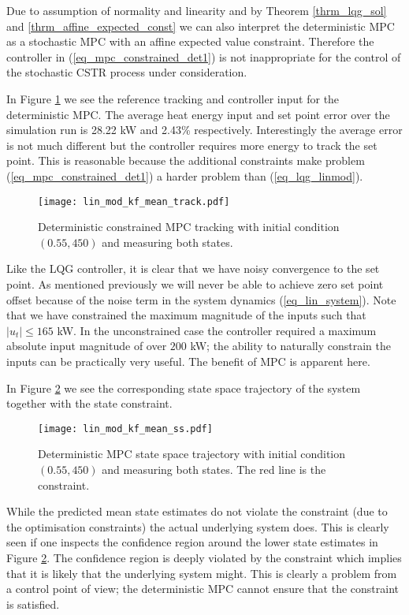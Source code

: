 Due to assumption of normality and linearity and by Theorem \ref{thrm_lqg_sol} and \ref{thrm_affine_expected_const} we can also interpret the deterministic MPC as a stochastic MPC with an affine expected value constraint. Therefore the controller in (\ref{eq_mpc_constrained_det1}) is not inappropriate for the control of the stochastic CSTR process under consideration.

In Figure \ref{fig_lin_mod_kf_mean_track} we see the reference tracking and controller input for the deterministic MPC. The average heat energy input and set point error over the simulation run is 28.22 kW and 2.43\% respectively. Interestingly the average error is not much different but the controller requires more energy to track the set point. This is reasonable because the additional constraints make problem (\ref{eq_mpc_constrained_det1}) a harder problem than (\ref{eq_lqg_linmod}).
\begin{figure}[H] 
\centering
\texttt{[image: lin\_mod\_kf\_mean\_track.pdf]}
\caption{Deterministic constrained MPC tracking with initial condition $(0.55, 450)$ and measuring both states.}
\label{fig_lin_mod_kf_mean_track}
\end{figure}
Like the LQG controller, it is clear that we have noisy convergence to the set point. As mentioned previously we will never be able to achieve zero set point offset because of the noise term in the system dynamics (\ref{eq_lin_system}). Note that we have constrained the maximum magnitude of the inputs such that $|u_t| \leq 165$ kW. In the unconstrained case the controller required a maximum absolute input magnitude of over $200$ kW; the ability to naturally constrain the inputs can be practically very useful. The benefit of MPC is apparent here.

In Figure \ref{fig_lin_mod_kf_mean_ss} we see the corresponding state space trajectory of the system together with the state constraint.
\begin{figure}[H]
\centering
\texttt{[image: lin\_mod\_kf\_mean\_ss.pdf]}
\caption{Deterministic MPC state space trajectory with initial condition $(0.55, 450)$ and measuring both states. The red line is the constraint.}
\label{fig_lin_mod_kf_mean_ss}
\end{figure}
While the predicted mean state estimates do not violate the constraint (due to the optimisation constraints) the actual underlying system does.  This is clearly seen if one inspects the confidence region around the lower state estimates in Figure \ref{fig_lin_mod_kf_mean_ss}. The confidence region is deeply violated by the constraint which implies that it is likely that the underlying system might. This is clearly a problem from a control point of view; the deterministic MPC cannot ensure that the constraint is satisfied.

